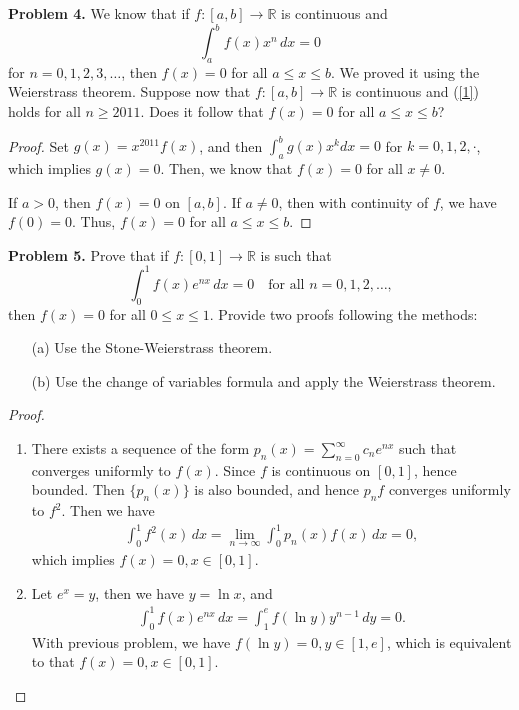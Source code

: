 \documentclass[12pt]{article}
\theoremstyle{definition}
\theoremstyle{definition}
\numberwithin{equation}{subsection}
\begin{document}
\medskip

\noindent
{\bf Problem 4.}
We know that if $f:[a,b]\to\mathbb{R}$ is continuous and
\begin{equation}
\label{1}
\int_a^b f(x)x^n\, dx = 0
\end{equation}
for $n=0,1,2,3,\ldots$, then $f(x)=0$ for all $a\leq x\leq b$.
We proved it using the Weierstrass theorem.
Suppose now that $f:[a,b]\to\mathbb{R}$ is continuous and (\ref{1})
holds for all $n\geq 2011$. Does it follow that
$f(x)=0$ for all $a\leq x\leq b$?
\begin{proof}
Set $g(x) = x^{2011}f(x)$, and then $\int^b_a g(x)x^k dx = 0$ for $k = 0,1,2,\cdot$, which implies $g(x) = 0$. Then, we know that $f(x) = 0$ for all $x\neq 0$.

If $a > 0$, then $f(x) = 0$ on $[a,b]$. If $a\neq 0$, then with continuity of $f$, we have $f(0) = 0$. Thus, $f(x) = 0$ for all $a\leq x\leq b$.
\end{proof}

\medskip


\noindent
{\bf Problem 5.}
Prove that if $f:[0,1]\to\mathbb{R}$ is such that
$$
\int_0^1 f(x) e^{nx}\, dx = 0
\quad
\mbox{for all $n=0,1,2,\ldots$,}
$$
then $f(x)=0$ for all $0\leq x\leq 1$.
Provide two proofs following the methods:
\begin{enumerate}
    \item[(a)] Use the Stone-Weierstrass theorem.
    \item[(b)] Use the change of variables formula and apply
the Weierstrass theorem.
\end{enumerate}
\begin{proof}
~\begin{enumerate}[label=(\alph*)]
    \item There exists a sequence of the form $p_n(x) = \sum^\infty_{n=0}c_n e^{nx}$ such that converges uniformly to $f(x)$. Since $f$ is continuous on $[0,1]$, hence bounded. Then $\{p_n(x)\}$ is also bounded, and hence $p_n f$ converges uniformly to $f^2$. Then we have
    \begin{align*}
        \int^1_0 f^2(x)\,dx = \lim_{n\to\infty} \int^1_0 p_n(x) f(x)\, dx = 0,
    \end{align*}
    which implies $f(x) = 0, x\in[0,1]$.
    \item Let $e^x = y$, then we have $y = \ln x$, and
    \begin{align*}
        \int_0^1 f(x) e^{nx}\, dx = \int_1^e f(\ln y) y^{n-1}\, dy = 0.
    \end{align*}
    With previous problem, we have $f(\ln y) = 0, y\in[1,e]$, which is equivalent to that $f(x) = 0, x\in[0,1]$.
\end{enumerate}
\end{proof}
\end{document}
